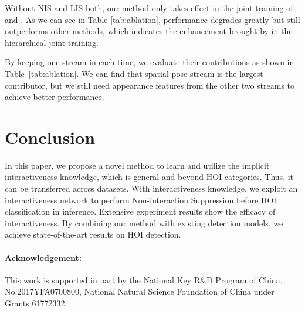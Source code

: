 \documentclass[10pt,twocolumn,letterpaper]{article}
\begin{document}
\begin{table}
\centering
{}
\caption{Results of ablation studies. Human, object, spatial-pose stream are representated as H, O and S-P stream.}
\label{tab:ablation}
\vspace{-0.3cm}
\end{table}

 Without NIS and LIS both, our method only takes effect in the joint training of  and . As we can see in Table \ref{tab:ablation}, performance degrades greatly but still outperforms other methods, which indicates the enhancement brought by  in the hierarchical joint training.

 By keeping one stream in  each time, we evaluate their contributions as shown in Table~\ref{tab:ablation}.
We can find that spatial-pose stream is the largest contributor, but we still need appearance features from the other two streams to achieve better performance.


\section{Conclusion}
In this paper, we propose a novel method to learn and utilize the implicit interactiveness knowledge,
which is general and beyond HOI categories. Thus, it can be transferred across datasets. 
With interactiveness knowledge, we exploit an interactiveness network to perform Non-interaction Suppression before HOI classification in inference. Extensive experiment results show the efficacy of interactiveness. By combining our method with existing detection models, we achieve state-of-the-art results on HOI detection.

{\small
\paragraph{Acknowledgement:} This work is supported in part by the National Key R\&D Program of China, No.2017YFA0700800, National Natural Science Foundation of China under Grants 61772332. 
}

{\small

}
\end{document}
